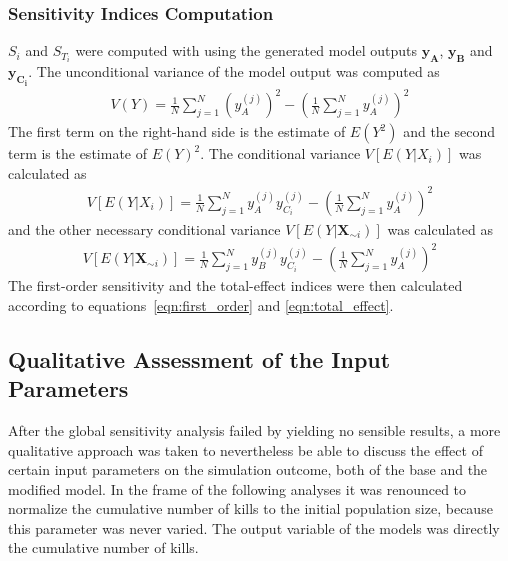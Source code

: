 \documentclass[11pt]{article}
\begin{document}
\subsubsection{Sensitivity Indices Computation}
$S_i$ and $S_{T_i}$ were computed with using the generated model outputs $\boldsymbol{y_A}$, $\boldsymbol{y_B}$ and $\boldsymbol{y_{C_i}}$. The unconditional variance of the model output was computed as
\begin{align}
V(Y) = \frac{1}{N} \sum_{j = 1}^N {\left( y_A^{(j)} \right)}^2 - \left( \frac{1}{N} \sum_{j = 1}^N y_A^{(j)} \right)^2
\end{align}
The first term on the right-hand side is the estimate of $E(Y^2)$ and the second term is the estimate of $E(Y)^2$. The conditional variance $V[E(Y|X_i)]$ was calculated as
\begin{align}
V[E(Y|X_i)] = \frac{1}{N} \sum_{j = 1}^N y_A^{(j)} y_{C_i}^{(j)} - \left( \frac{1}{N} \sum_{j = 1}^N y_A^{(j)} \right)^2
\end{align}
and the other necessary conditional variance $V[E(Y|\textbf{X}_{\sim i})]$ was calculated as
\begin{align}
V[E(Y|\textbf{X}_{\sim i})] = \frac{1}{N} \sum_{j = 1}^N y_B^{(j)} y_{C_i}^{(j)} - \left( \frac{1}{N} \sum_{j = 1}^N y_A^{(j)} \right)^2
\end{align}
The first-order sensitivity and the total-effect indices were then calculated according to equations~\eqref{eqn:first_order} and \eqref{eqn:total_effect}.

\subsection{Qualitative Assessment of the Input Parameters}
After the global sensitivity analysis failed by yielding no sensible results, a more qualitative approach was taken to nevertheless be able to discuss the effect of certain input parameters on the simulation outcome, both of the base and the modified model. In the frame of the following analyses it was renounced to normalize the cumulative number of kills to the initial population size, because this parameter was never varied. The output variable of the models was directly the cumulative number of kills.
\end{document}
